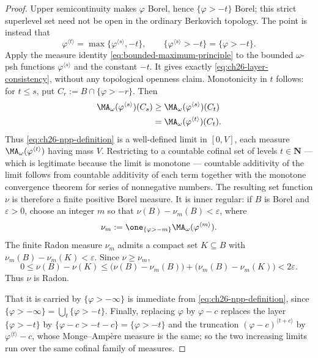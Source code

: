 \begin{proof}
Upper semicontinuity makes \(\varphi\) Borel, hence
\(\{\varphi>-t\}\) Borel; this strict superlevel set need not be open in
the ordinary Berkovich topology.  The point is instead that
\[
 \varphi^{\langle t\rangle}
   =\max\{\varphi^{\langle s\rangle},-t\},
 \qquad
 \{\varphi^{\langle s\rangle}>-t\}=\{\varphi>-t\}.
\]
Apply the measure identity \eqref{eq:bounded-maximum-principle} to the
bounded \(\omega\)-psh functions \(\varphi^{\langle s\rangle}\) and the
constant \(-t\).  It gives exactly
\eqref{eq:ch26-layer-consistency}, without any topological openness claim.
Monotonicity in \(t\) follows: for
\(t\leq s\), put \(C_r:=B\cap\{\varphi>-r\}\).  Then
\[
 \begin{aligned}
 \MA_\omega(\varphi^{\langle s\rangle})(C_s)
 &\geq\MA_\omega(\varphi^{\langle s\rangle})(C_t)\\
 &=\MA_\omega(\varphi^{\langle t\rangle})(C_t).
 \end{aligned}
\]
Thus \eqref{eq:ch26-npp-definition} is a well-defined limit in
\([0,V]\), each measure \(\MA_\omega(\varphi^{\langle t\rangle})\) having
mass \(V\).  Restricting to a countable cofinal set of levels
\(t\in\mathbf N\) --- which is legitimate because the limit is monotone ---
countable additivity of the limit follows from countable additivity of each
term together with the monotone convergence theorem for series of
nonnegative numbers.  The resulting set function \(\nu\) is therefore a
finite positive Borel measure.  It is inner regular: if \(B\) is Borel and
\(\varepsilon>0\), choose an integer \(m\) so that
\(\nu(B)-\nu_m(B)<\varepsilon\), where
\[
 \nu_m:=\one_{\{\varphi>-m\}}
          \MA_\omega(\varphi^{\langle m\rangle}).
\]
The finite Radon measure \(\nu_m\) admits a compact set \(K\subseteq B\)
with \(\nu_m(B)-\nu_m(K)<\varepsilon\).  Since \(\nu\geq\nu_m\),
\[
 0\leq\nu(B)-\nu(K)
 \leq\bigl(\nu(B)-\nu_m(B)\bigr)
      +\bigl(\nu_m(B)-\nu_m(K)\bigr)<2\varepsilon.
\]
Thus \(\nu\) is Radon.

That it is carried by \(\{\varphi>-\infty\}\) is immediate from
\eqref{eq:ch26-npp-definition}, since
\(\{\varphi>-\infty\}=\bigcup_{t}\{\varphi>-t\}\).  Finally, replacing
\(\varphi\) by \(\varphi-c\) replaces the layer \(\{\varphi>-t\}\) by
\(\{\varphi-c>-t-c\}=\{\varphi>-t\}\) and the truncation
\((\varphi-c)^{\langle t+c\rangle}\) by
\(\varphi^{\langle t\rangle}-c\), whose Monge--Amp\`ere measure is the same;
so the two increasing limits run over the same cofinal family of measures.
\end{proof}

